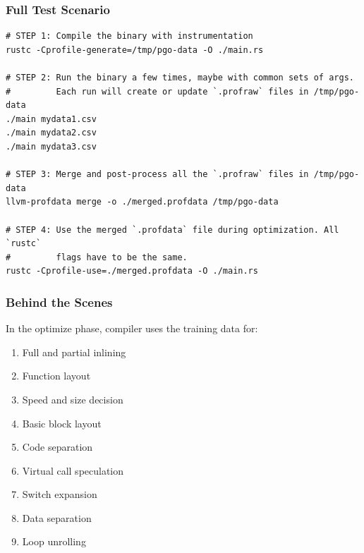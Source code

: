 \begin{frame}[fragile]
\frametitle{Full Test Scenario}

{\scriptsize
\begin{verbatim}
# STEP 1: Compile the binary with instrumentation
rustc -Cprofile-generate=/tmp/pgo-data -O ./main.rs

# STEP 2: Run the binary a few times, maybe with common sets of args.
#         Each run will create or update `.profraw` files in /tmp/pgo-data
./main mydata1.csv
./main mydata2.csv
./main mydata3.csv

# STEP 3: Merge and post-process all the `.profraw` files in /tmp/pgo-data
llvm-profdata merge -o ./merged.profdata /tmp/pgo-data

# STEP 4: Use the merged `.profdata` file during optimization. All `rustc`
#         flags have to be the same.
rustc -Cprofile-use=./merged.profdata -O ./main.rs
\end{verbatim}
}

\end{frame}



\begin{frame}
\frametitle{Behind the Scenes}



In the optimize phase, compiler uses the training data for:

\begin{enumerate}
\item Full and partial inlining
\item Function layout
\item Speed and size decision
\item Basic block layout 
\item Code separation
\item Virtual call speculation
\item Switch expansion
\item Data separation
\item Loop unrolling
\end{enumerate}

\end{frame}



